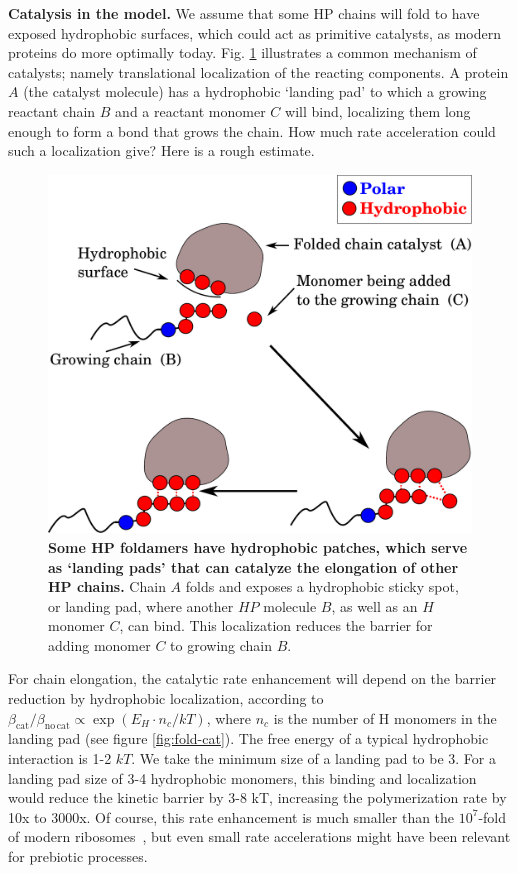 \documentclass[5p,times]{elsarticle}
\begin{document}
\textbf{Catalysis in the model.}  We assume that some HP chains will fold to have exposed 
hydrophobic surfaces, which could 
act as primitive catalysts, as modern proteins do more optimally today.  Fig. 
\ref{fig:hp-catalysis} illustrates a common mechanism of catalysts; namely translational 
localization of the reacting components.  A protein $A$ (the catalyst molecule) has a hydrophobic 
`landing pad' to which a growing reactant chain $B$ and a reactant monomer $C$ will bind, 
localizing 
them long enough to form a bond that grows the chain.  How much rate acceleration could such a 
localization give?  Here is a rough estimate.  

   \begin{figure}[h!]
  \centering
  \includegraphics[width=0.8\columnwidth]{pictures/hp-catalysis.pdf} 
  \caption{\footnotesize{\textbf{Some HP foldamers have hydrophobic patches, which serve as 
`landing pads' that can catalyze the elongation of other HP chains.}  Chain $A$ folds and exposes a 
hydrophobic sticky spot, or landing pad, where another $HP$ molecule $B$, as well as an $H$ monomer 
$C$, can bind.  This localization reduces the barrier for adding monomer $C$ to growing chain $B$.}}
  \label{fig:hp-catalysis}
\end{figure} 

 For chain elongation, the catalytic rate enhancement will depend on the barrier reduction by 
hydrophobic localization, according to $\beta_\mathrm{cat}/ \beta_\mathrm{no\,cat} 
\propto \exp(E_{H}\cdot n_{c}/kT)$, where $n_c$ is the number of H monomers in the 
landing pad (see figure \ref{fig:fold-cat}).  The free energy of a typical hydrophobic interaction 
is 1-2 $kT$.  We take the minimum size of a landing pad to be 3.  For a landing pad size of 3-4 
hydrophobic monomers, this binding and localization would reduce the kinetic barrier by 3-8 kT, 
increasing the polymerization rate by 10x to 3000x.  Of course, this rate enhancement is much 
smaller than the $10^7$-fold of modern ribosomes~\cite{Sievers2004a}, but even small rate 
accelerations might have been relevant for prebiotic processes.
  
\end{document}
